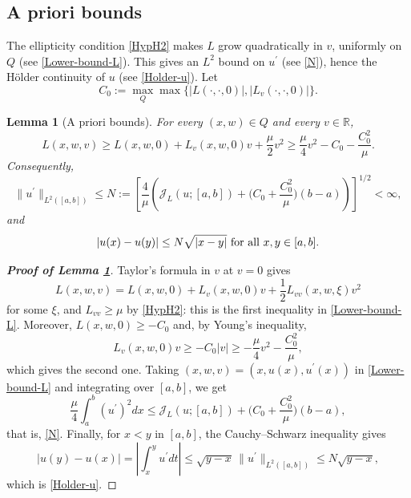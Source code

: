 \documentclass[reqno,12pt]{amsart}
\numberwithin{equation}{section}
\def\RR{{\mathds R}}
\def\J{\mathcal{J}_L}
\newtheorem{lemma}[theorem]{Lemma}
\theoremstyle{remark}
\begin{document}
\subsection{A priori bounds} The ellipticity condition \ref{HypH2} makes $L$ grow quadratically in $v$, uniformly on $Q$ (see \eqref{Lower-bound-L}). This gives an $L^2$ bound on $u^\prime$ (see \eqref{N}), hence the H\"older continuity of $u$ (see \eqref{Holder-u}). Let
\begin{equation*}
C_0:=\max_{Q}\max\big\{|L(\cdot,\cdot,0)|,|L_v(\cdot,\cdot,0)|\big\}.
\end{equation*}

\begin{lemma}[A priori bounds]\label{L-apriori}
For every $(x,w)\in Q$ and every $v\in\RR$,
\begin{equation}\label{Lower-bound-L}
L(x,w,v)\geq L(x,w,0)+L_v(x,w,0)v+\frac\mu2v^2\geq\frac\mu4v^2-C_0-\frac{C_0^2}{\mu}.
\end{equation}
Consequently,
\begin{equation}\label{N}
\|u^\prime\|_{L^2([a,b])}\leq N:=\left[\frac4\mu\left(\J(u;[a,b])+\Big(C_0+\frac{C_0^2}{\mu}\Big)(b-a)\right)\right]^{1/2}<\infty,
\end{equation}
and
\begin{equation}\label{Holder-u}
|u(x)-u(y)|\leq N\sqrt{|x-y|}\hbox{ for all }x,y\in[a,b].
\end{equation}
\end{lemma}

\begin{proof}[\bf Proof of Lemma \ref{L-apriori}]
Taylor's formula in $v$ at $v=0$ gives
\begin{equation*}
L(x,w,v)=L(x,w,0)+L_v(x,w,0)v+\frac12L_{vv}(x,w,\xi)v^2
\end{equation*}
for some $\xi$, and $L_{vv}\geq\mu$ by \ref{HypH2}: this is the first inequality in \eqref{Lower-bound-L}. Moreover, $L(x,w,0)\geq-C_0$ and, by Young's inequality,
\begin{equation*}
L_v(x,w,0)v\geq-C_0|v|\geq-\frac\mu4v^2-\frac{C_0^2}\mu,
\end{equation*}
which gives the second one. Taking $(x,w,v)=(x,u(x),u^\prime(x))$ in \eqref{Lower-bound-L} and integrating over $[a,b]$, we get
\begin{equation*}
\frac\mu4\int_a^b(u^\prime)^2dx\leq\J(u;[a,b])+\Big(C_0+\frac{C_0^2}\mu\Big)(b-a),
\end{equation*}
that is, \eqref{N}. Finally, for $x<y$ in $[a,b]$, the Cauchy--Schwarz inequality gives
\begin{equation*}
|u(y)-u(x)|=\left|\int_x^yu^\prime dt\right|\leq\sqrt{y-x}\,\|u^\prime\|_{L^2([a,b])}\leq N\sqrt{y-x},
\end{equation*}
which is \eqref{Holder-u}.
\end{proof}
\end{document}
